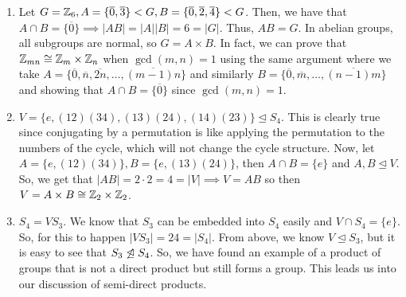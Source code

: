 \documentclass[11pt,leqno,oneside]{amsart}
\newcommand{\subgroup}{\mathrel{<}}
\newcommand{\normsubgroup}{\mathrel{\unlhd}}
\begin{document}
\begin{example}
    \begin{enumerate}[label=(\alph*)]
        \item Let $G = \Z_6, A = \{\overline{0}, \overline{3}\} \subgroup G, B
            = \{\overline{0}, \overline{2}, \overline{4}\} \subgroup G$. Then,
            we have that $A \cap B = \{ \overline{0} \} \implies |AB|=|A||B| =
            6 = |G|$. Thus, $AB = G$. In abelian groups, all subgroups are
            normal, so $G = A \times B$. In fact, we can prove that ${\mathbb Z}_{mn}
            \mathrel{\cong} {\mathbb Z}_m \times {\mathbb Z}_n$ when $\gcd(m,n) = 1$ using the same
            argument where we take $A = \{\overline{0}, \overline{n},
            \overline{2n}, \ldots, \overline{(m-1)n}\}$ and similarly $B =
            \{\overline{0}, \overline{m}, \ldots, \overline{(n-1)m}\}$ and
            showing that $A \cap B = \{\overline{0}\}$ since $\gcd(m,n) = 1$.
        \item $V = \{e, (12)(34), (13)(24), (14)(23)\} \normsubgroup S_4$. This
            is clearly true since conjugating by a permutation is like applying
            the permutation to the numbers of the cycle, which will not change
            the cycle structure. Now, let $A = \{e, (12)(34)\}, B = \{e, (13)(24)\}$, then $A \cap B = \{e\}$ and $A,B \normsubgroup V$. So,
            we get that $|AB| = 2\cdot 2 = 4 = |V| \implies V = AB$ so then $V
            = A \times B \mathrel{\cong} {\mathbb Z}_2 \times {\mathbb Z}_2$.
        \item $S_4 = VS_3$. We know that $S_3$ can be embedded into $S_4$
            easily and $V \cap S_4 = \{e\}$. So, for this to happen $|VS_3| =
            24 = |S_4|$. From above, we know $V \normsubgroup S_3$, but it is
            easy to see that $S_3 \not\normsubgroup S_4$. So, we have found an
            example of a product of groups that is not a direct product but
            still forms a group. This leads us into our discussion of
            semi-direct products.
    \end{enumerate}
\end{example}
\end{document}
